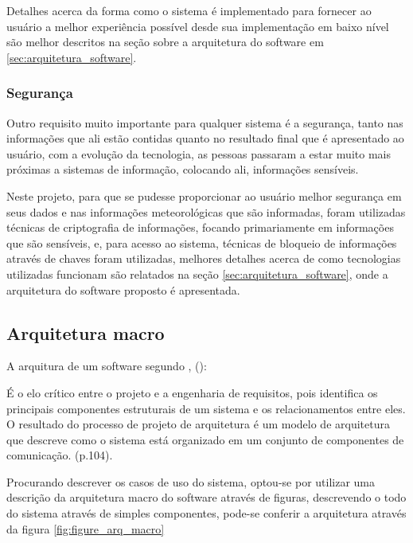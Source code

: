 Detalhes acerca da forma como o sistema é implementado para fornecer ao usuário a melhor experiência possível desde sua implementação em baixo nível são melhor descritos na seção sobre a arquitetura do software em \ref{sec:arquitetura_software}.

\subsubsection{Segurança}

Outro requisito muito importante para qualquer sistema é a segurança, tanto nas informações que ali estão contidas quanto no resultado final que é apresentado ao usuário, com a evolução da tecnologia, as pessoas passaram a estar muito mais próximas a sistemas de informação, colocando ali, informações sensíveis.

Neste projeto, para que se pudesse proporcionar ao usuário melhor segurança em seus dados e nas informações meteorológicas que são informadas, foram utilizadas técnicas de criptografia de informações, focando primariamente em informações que são sensíveis, e, para acesso ao sistema, técnicas de bloqueio de informações através de chaves foram utilizadas, melhores detalhes acerca de como tecnologias utilizadas funcionam são relatados na seção \ref{sec:arquitetura_software}, onde a arquitetura do software proposto é apresentada.

\subsection{Arquitetura macro}

A arquitura de um software segundo , (\citeyear{engenharia_software_sommerville}):

\begin{citacao}
    É o elo crítico entre o projeto e a engenharia de requisitos, pois identifica os principais componentes estruturais de um sistema e os relacionamentos entre eles. O resultado do processo de projeto de arquitetura é um modelo de arquitetura que descreve como o sistema está organizado em um conjunto de componentes de comunicação. (p.104).
\end{citacao}

Procurando descrever os casos de uso do sistema, optou-se por utilizar uma descrição da arquitetura macro do software através de figuras, descrevendo o todo do sistema através de simples componentes, pode-se conferir a arquitetura através da figura \ref{fig:figure_arq_macro}

